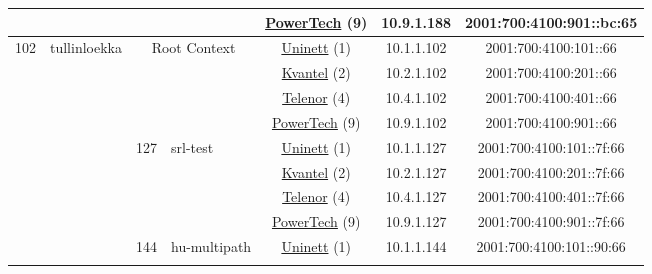 \begin{small}
\begin{center}
\begin{longtable}{|c|c|c|c|c|c|c|c|}
  &  &  &  & \multicolumn{2}{|c|}{\tiny{\href{http://www.powertech.no}{PowerTech} (9)}} & \tiny{10.9.1.188} & \tiny{2001:700:4100:901::bc:65} \\ \hline
 \multirow{20}{*}{\tiny{102}} & \multicolumn{1}{|l|}{\multirow{20}{*}{\tiny{tullinloekka}}} & \multicolumn{2}{|c|}{\multirow{4}{*}{\tiny{Root Context}}} & \multicolumn{2}{|c|}{\tiny{\href{https://www.uninett.no}{Uninett} (1)}} & \tiny{10.1.1.102} & \tiny{2001:700:4100:101::66} \\* \cline{5-5}\cline{6-6}\cline{7-7}\cline{8-8}
  &  & \multicolumn{2}{|c|}{} & \multicolumn{2}{|c|}{\tiny{\href{http://kvantel.no}{Kvantel} (2)}} & \tiny{10.2.1.102} & \tiny{2001:700:4100:201::66} \\* \cline{5-5}\cline{6-6}\cline{7-7}\cline{8-8}
  &  & \multicolumn{2}{|c|}{} & \multicolumn{2}{|c|}{\tiny{\href{https://www.telenor.no}{Telenor} (4)}} & \tiny{10.4.1.102} & \tiny{2001:700:4100:401::66} \\* \cline{5-5}\cline{6-6}\cline{7-7}\cline{8-8}
  &  & \multicolumn{2}{|c|}{} & \multicolumn{2}{|c|}{\tiny{\href{http://www.powertech.no}{PowerTech} (9)}} & \tiny{10.9.1.102} & \tiny{2001:700:4100:901::66} \\* \cline{3-3}\cline{4-4}\cline{5-5}\cline{6-6}\cline{7-7}\cline{8-8}
  &  & \multirow{4}{*}{\tiny{127}} & \multicolumn{1}{|l|}{\multirow{4}{*}{\tiny{srl-test}}} & \multicolumn{2}{|c|}{\tiny{\href{https://www.uninett.no}{Uninett} (1)}} & \tiny{10.1.1.127} & \tiny{2001:700:4100:101::7f:66} \\* \cline{5-5}\cline{6-6}\cline{7-7}\cline{8-8}
  &  &  &  & \multicolumn{2}{|c|}{\tiny{\href{http://kvantel.no}{Kvantel} (2)}} & \tiny{10.2.1.127} & \tiny{2001:700:4100:201::7f:66} \\* \cline{5-5}\cline{6-6}\cline{7-7}\cline{8-8}
  &  &  &  & \multicolumn{2}{|c|}{\tiny{\href{https://www.telenor.no}{Telenor} (4)}} & \tiny{10.4.1.127} & \tiny{2001:700:4100:401::7f:66} \\* \cline{5-5}\cline{6-6}\cline{7-7}\cline{8-8}
  &  &  &  & \multicolumn{2}{|c|}{\tiny{\href{http://www.powertech.no}{PowerTech} (9)}} & \tiny{10.9.1.127} & \tiny{2001:700:4100:901::7f:66} \\* \cline{3-3}\cline{4-4}\cline{5-5}\cline{6-6}\cline{7-7}\cline{8-8}
  &  & \multirow{4}{*}{\tiny{144}} & \multicolumn{1}{|l|}{\multirow{4}{*}{\tiny{hu-multipath}}} & \multicolumn{2}{|c|}{\tiny{\href{https://www.uninett.no}{Uninett} (1)}} & \tiny{10.1.1.144} & \tiny{2001:700:4100:101::90:66} \\* \cline{5-5}\cline{6-6}\cline{7-7}\cline{8-8}

\end{longtable}
\end{center}
\end{small}
